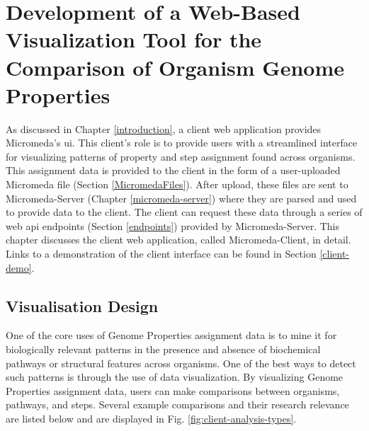 \chapter{Development of a Web-Based Visualization Tool for the Comparison of 
Organism Genome Properties} \label{micromeda-client}

As discussed in Chapter \ref{introduction}, a client web application provides 
Micromeda's \gls{ui}. This client's role is to provide users with a streamlined 
interface for visualizing patterns of property and step assignment found across 
organisms. This assignment data is provided to the client in the form of a 
user-uploaded Micromeda file (Section \ref{MicromedaFiles}). After upload, these 
files are sent to Micromeda-Server (Chapter \ref{micromeda-server}) where they 
are parsed and used to provide data to the client. The client can request these 
data through a series of web \gls{api} endpoints (Section \ref{endpoints}) 
provided by Micromeda-Server. This chapter discusses the client web application, 
called Micromeda-Client, in detail. Links to a demonstration of the client 
interface can be found in Section \ref{client-demo}.

\section{Visualisation Design} \label{visualization-design}

One of the core uses of Genome Properties assignment data is to mine it for 
biologically relevant patterns in the presence and absence of biochemical 
pathways or structural features across organisms. One of the best ways to detect 
such patterns is through the use of data visualization. By visualizing Genome 
Properties assignment data, users can make comparisons between organisms, 
pathways, and steps. Several example comparisons and their research relevance 
are listed below and are displayed in Fig. \ref{fig:client-analysis-types}. 

